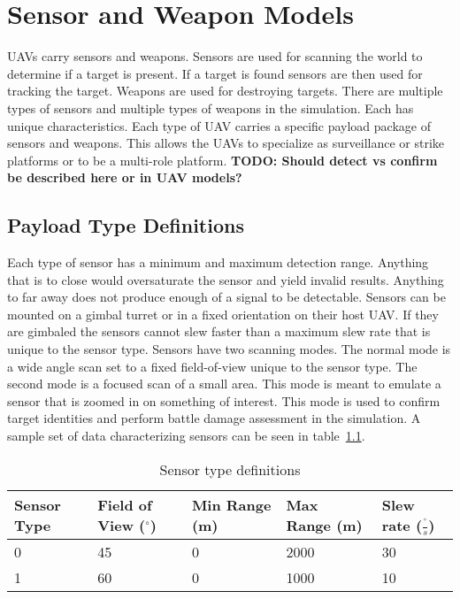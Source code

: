 \chapter{Sensor and Weapon Models}
UAVs carry sensors and weapons.  Sensors are used for scanning the world to determine if a target is present.  If a target is found sensors are then used for tracking the target.  Weapons are used for destroying targets.  There are multiple types of sensors and multiple types of weapons in the simulation.  Each has unique characteristics.  Each type of UAV carries a specific payload package of sensors and weapons.  This allows the UAVs to specialize as surveillance or strike platforms or to be a multi-role platform. \textbf{TODO: Should detect vs confirm be described here or in UAV models?}

\section{Payload Type Definitions}

Each type of sensor has a minimum and maximum detection range.  Anything that is to close would oversaturate the sensor and yield invalid results.  Anything to far away does not produce enough of a signal to be detectable.  Sensors can be mounted on a gimbal turret or in a fixed orientation on their host UAV.  If they are gimbaled the sensors cannot slew faster than a maximum slew rate that is unique to the sensor type.  Sensors have two scanning modes.  The normal mode is a wide angle scan set to a fixed field-of-view unique to the sensor type.  The second mode is a focused scan of a small area.  This mode is meant to emulate a sensor that is zoomed in on something of interest.  This mode is used to confirm target identities and perform battle damage assessment in the simulation.  A sample set of data characterizing sensors can be seen in table~\ref{tab:sensorType}.

\begin{table}[H]
	\caption{Sensor type definitions}
	\centering
	\label{tab:sensorType}
	\begin{tabular}{|p{1cm}|p{1.5cm}|p{1cm}|p{1cm}|p{1.5cm}|}
		\hline
		Sensor Type & Field of View ($^{\circ}$) & Min Range (m) & Max Range (m) & Slew rate ($\frac{^{\circ}}{s}$)\\ \hline
		0 & 45 & 0 & 2000 & 30 \\
		1 & 60 & 0 & 1000 & 10 \\
		\hline
	\end{tabular}
\end{table}

